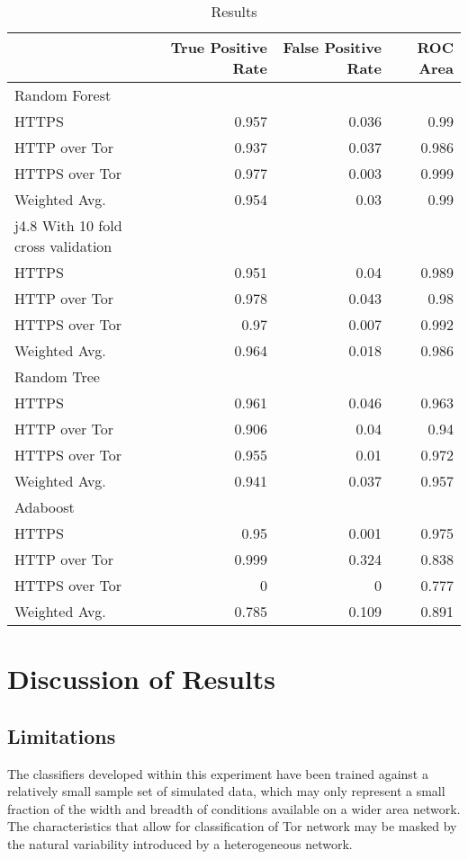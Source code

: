 \begin{table}[H]
  \begin{tabular}{lrrr}
    \toprule
    & True Positive Rate & False Positive Rate & ROC Area \\
    \midrule
    Random Forest\\
    \midrule
    HTTPS & 0.957 & 0.036 & 0.99\\
    HTTP over Tor & 0.937 & 0.037 & 0.986\\
    HTTPS over Tor & 0.977 & 0.003 & 0.999\\
    Weighted Avg. & 0.954 & 0.03 & 0.99\\
    \midrule
    j4.8 With 10 fold cross validation\\
    \midrule
    HTTPS & 0.951 & 0.04 & 0.989\\
    HTTP over Tor & 0.978 & 0.043 & 0.98\\
    HTTPS over Tor & 0.97 & 0.007 & 0.992\\
    Weighted Avg. & 0.964 & 0.018 & 0.986\\
    \midrule
    Random Tree\\
    \midrule
    HTTPS & 0.961 & 0.046 & 0.963\\
    HTTP over Tor & 0.906 & 0.04 & 0.94\\
    HTTPS over Tor & 0.955 & 0.01 & 0.972\\
    Weighted Avg. & 0.941 & 0.037 & 0.957\\
    \midrule
    Adaboost\\
    \midrule
    HTTPS & 0.95 & 0.001 & 0.975\\
    HTTP over Tor & 0.999 & 0.324 & 0.838\\
    HTTPS over Tor & 0 & 0 & 0.777\\
    Weighted Avg. & 0.785 & 0.109 & 0.891\\
    \bottomrule
  \end{tabular}
  \caption{Results}
  \label{table:results}
\end{table}

\chapter{Discussion of Results}

\section{Limitations}

The classifiers developed within this experiment have been trained against
a relatively small sample set of simulated data, which may only represent
a small fraction of the width and breadth of conditions available on a wider
area network. The characteristics that allow for classification of Tor network
may be masked by the natural variability introduced by a heterogeneous network.

